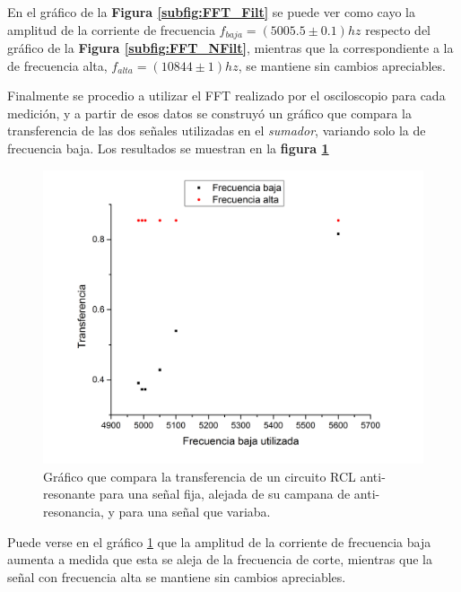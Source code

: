 \documentclass[11pt,a4paper]{article}
\begin{document}
En el gráfico de la \textbf{Figura \ref{subfig:FFT_Filt}} se puede ver como cayo la amplitud de la corriente de frecuencia $f_{baja}= (5005.5 \pm 0.1)hz$ respecto del gráfico de la \textbf{Figura \ref{subfig:FFT_NFilt}}, mientras que la correspondiente a la de frecuencia alta, $f_{alta} = (10844 \pm 1)hz$, se mantiene sin cambios apreciables.

Finalmente se procedio a utilizar el FFT realizado por el osciloscopio para cada medición, y a partir de esos datos se construyó un gráfico que compara la transferencia de las dos señales utilizadas en el \textit{sumador}, variando solo la de frecuencia baja. Los resultados se muestran en la \textbf{figura \ref{fig:Comp}}

\begin{figure}[H]
\centering
\includegraphics[scale=0.5]{Comparacion}
\caption{Gráfico que compara la transferencia de un circuito RCL anti-resonante para una señal fija, alejada de su campana de anti-resonancia, y para una señal que 
variaba. }
\label{fig:Comp}
\end{figure}

Puede verse en el gráfico \ref{fig:Comp} que la amplitud de la corriente de frecuencia baja aumenta a medida que esta se aleja de la frecuencia de corte, mientras que la señal con frecuencia alta se mantiene sin cambios apreciables.


\end{document}
